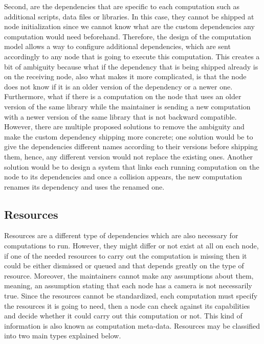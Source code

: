  Second, are the dependencies that are specific to each computation such as additional scripts, data files or libraries. In this case, they cannot be shipped at node initialization since we cannot know what are the custom dependencies any computation would need beforehand. Therefore, the design of the computation model allows a way to configure additional dependencies, which are sent accordingly to any node that is going to execute this computation.
  This creates a bit of ambiguity because what if the dependency that is being shipped  already is on the receiving node, also what makes it more complicated, is that the node does not know if it is an older version of the dependency or a newer one. Furthermore, what if there is a computation on the node that uses an older version of the same library while the maintainer is sending a new computation with a newer version of the same library that is not backward compatible. However, there are multiple proposed solutions to remove the ambiguity and make the custom dependency shipping more concrete; one solution would be to give the dependencies different names according to their versions before shipping them, hence, any different version would not replace the existing ones. Another solution would be to design a system that links each running computation on the node to its dependencies and once a collision appears, the new computation renames its dependency and uses the renamed one.
 
\newpage
\subsection {Resources}



Resources are a different type of dependencies which are also necessary for computations to run. However, they might differ or not exist at all on each node, if one of the needed resources to carry out the computation is missing then it could be either dismissed or queued and that depends greatly on the type of resource. Moreover, the maintainers cannot make any assumptions about them, meaning, an assumption stating that each node has a camera is not necessarily true. Since the resources cannot be standardized, each computation must specify the resources it is going to need, then a node can check against its capabilities and decide whether it could carry out this computation or not. This kind of information is also known as computation meta-data. Resources may be classified into two main types explained below.

